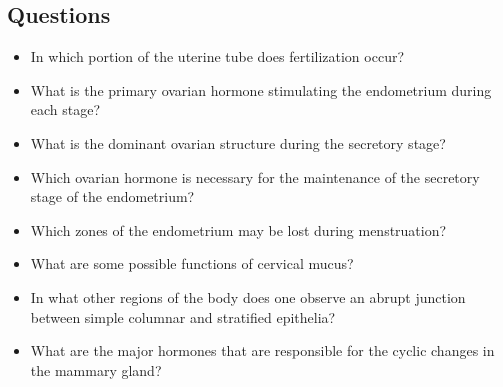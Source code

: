 \subsection{Questions}
\begin{itemize}\color{minor}
  \item In which portion of the uterine tube does fertilization occur?
  
  \item What is the primary ovarian hormone stimulating the endometrium during each stage?\\
  
  \item What is the dominant ovarian structure during the secretory stage?

  \item Which ovarian hormone is necessary for the maintenance of the secretory stage of the endometrium?
  
  \item Which zones of the endometrium may be lost during menstruation?

  \item What are some possible functions of cervical mucus?

  \item In what other regions of the body does one observe an abrupt junction between simple columnar and stratified epithelia?

  \item  What are the major hormones that are responsible for the cyclic changes in the mammary gland?
\end{itemize}

